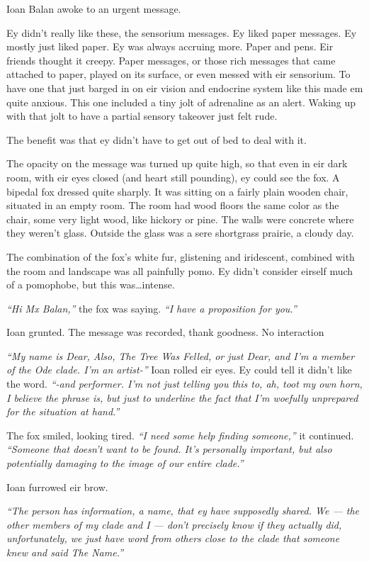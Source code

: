 Ioan Balan awoke to an urgent message.

Ey didn't really like these, the sensorium messages. Ey liked paper messages. Ey mostly just liked paper. Ey was always accruing more. Paper and pens. Eir friends thought it creepy. Paper messages, or those rich messages that came attached to paper, played on its surface, or even messed with eir sensorium. To have one that just barged in on eir vision and endocrine system like this made em quite anxious. This one included a tiny jolt of adrenaline as an alert. Waking up with that jolt to have a partial sensory takeover just felt rude.

The benefit was that ey didn't have to get out of bed to deal with it.

The opacity on the message was turned up quite high, so that even in eir dark room, with eir eyes closed (and heart still pounding), ey could see the fox. A bipedal fox dressed quite sharply. It was sitting on a fairly plain wooden chair, situated in an empty room. The room had wood floors the same color as the chair, some very light wood, like hickory or pine. The walls were concrete where they weren't glass. Outside the glass was a sere shortgrass prairie, a cloudy day.

The combination of the fox's white fur, glistening and iridescent, combined with the room and landscape was all painfully pomo. Ey didn't consider eirself much of a pomophobe, but this was\ldots{}intense.

\emph{``Hi Mx Balan,''} the fox was saying. \emph{``I have a proposition for you.''}

Ioan grunted. The message was recorded, thank goodness. No interaction

\emph{``My name is Dear, Also, The Tree Was Felled, or just Dear, and I'm a member of the Ode clade. I'm an artist-''} Ioan rolled eir eyes. Ey could tell it didn't like the word. \emph{``-and performer. I'm not just telling you this to, ah, toot my own horn, I believe the phrase is, but just to underline the fact that I'm woefully unprepared for the situation at hand.''}

The fox smiled, looking tired. \emph{``I need some help finding someone,''} it continued. \emph{``Someone that doesn't want to be found. It's personally important, but also potentially damaging to the image of our entire clade.''}

Ioan furrowed eir brow.

\emph{``The person has information, a name, that ey have supposedly shared. We --- the other members of my clade and I --- don't precisely know if they actually did, unfortunately, we just have word from others close to the clade that someone knew and said The Name.''}

